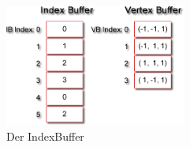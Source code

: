 \begin{Spacing}{\mylinespace}
\begin{figure}[h!]
	\vspace*{30px}
	\centering
	\includegraphics[height=150px]{graphics/indexbuffer2.png}	
	\caption{Der IndexBuffer}
	\label{fig:IndexBuffer}
\end{figure}

\end{Spacing}
\clearpage
